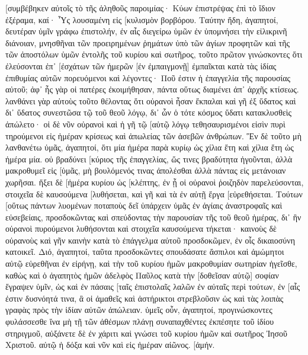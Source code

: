 [συμβέβηκεν αὐτοῖς τὸ τῆς ἀληθοῦς παροιμίας· Κύων ἐπιστρέψας ἐπὶ τὸ ἴδιον ἐξέραμα, καί· Ὗς λουσαμένη εἰς [κυλισμὸν βορβόρου. 
Ταύτην ἤδη, ἀγαπητοί, δευτέραν ὑμῖν γράφω ἐπιστολήν, ἐν αἷς διεγείρω ὑμῶν ἐν ὑπομνήσει τὴν εἰλικρινῆ διάνοιαν, 
μνησθῆναι τῶν προειρημένων ῥημάτων ὑπὸ τῶν ἁγίων προφητῶν καὶ τῆς τῶν ἀποστόλων ὑμῶν ἐντολῆς τοῦ κυρίου καὶ σωτῆρος, 
τοῦτο πρῶτον γινώσκοντες ὅτι ἐλεύσονται ἐπ᾽ [ἐσχάτων τῶν ἡμερῶν [ἐν ἐμπαιγμονῇ] ἐμπαῖκται κατὰ τὰς ἰδίας ἐπιθυμίας αὐτῶν πορευόμενοι 
καὶ λέγοντες· Ποῦ ἐστιν ἡ ἐπαγγελία τῆς παρουσίας αὐτοῦ; ἀφ᾽ ἧς γὰρ οἱ πατέρες ἐκοιμήθησαν, πάντα οὕτως διαμένει ἀπ᾽ ἀρχῆς κτίσεως. 
λανθάνει γὰρ αὐτοὺς τοῦτο θέλοντας ὅτι οὐρανοὶ ἦσαν ἔκπαλαι καὶ γῆ ἐξ ὕδατος καὶ δι᾽ ὕδατος συνεστῶσα τῷ τοῦ θεοῦ λόγῳ, 
δι᾽ ὧν ὁ τότε κόσμος ὕδατι κατακλυσθεὶς ἀπώλετο· 
οἱ δὲ νῦν οὐρανοὶ καὶ ἡ γῆ τῷ [αὐτῷ λόγῳ τεθησαυρισμένοι εἰσὶν πυρὶ τηρούμενοι εἰς ἡμέραν κρίσεως καὶ ἀπωλείας τῶν ἀσεβῶν ἀνθρώπων. 
Ἓν δὲ τοῦτο μὴ λανθανέτω ὑμᾶς, ἀγαπητοί, ὅτι μία ἡμέρα παρὰ κυρίῳ ὡς χίλια ἔτη καὶ χίλια ἔτη ὡς ἡμέρα μία. 
οὐ βραδύνει [κύριος τῆς ἐπαγγελίας, ὥς τινες βραδύτητα ἡγοῦνται, ἀλλὰ μακροθυμεῖ εἰς [ὑμᾶς, μὴ βουλόμενός τινας ἀπολέσθαι ἀλλὰ πάντας εἰς μετάνοιαν χωρῆσαι. 
ἥξει δὲ [ἡμέρα κυρίου ὡς [κλέπτης, ἐν ᾗ οἱ οὐρανοὶ ῥοιζηδὸν παρελεύσονται, στοιχεῖα δὲ καυσούμενα [λυθήσεται, καὶ γῆ καὶ τὰ ἐν αὐτῇ ἔργα [εὑρεθήσεται. 
Τούτων [οὕτως πάντων λυομένων ποταποὺς δεῖ ὑπάρχειν ὑμᾶς ἐν ἁγίαις ἀναστροφαῖς καὶ εὐσεβείαις, 
προσδοκῶντας καὶ σπεύδοντας τὴν παρουσίαν τῆς τοῦ θεοῦ ἡμέρας, δι᾽ ἣν οὐρανοὶ πυρούμενοι λυθήσονται καὶ στοιχεῖα καυσούμενα τήκεται· 
καινοὺς δὲ οὐρανοὺς καὶ γῆν καινὴν κατὰ τὸ ἐπάγγελμα αὐτοῦ προσδοκῶμεν, ἐν οἷς δικαιοσύνη κατοικεῖ. 
Διό, ἀγαπητοί, ταῦτα προσδοκῶντες σπουδάσατε ἄσπιλοι καὶ ἀμώμητοι αὐτῷ εὑρεθῆναι ἐν εἰρήνῃ, 
καὶ τὴν τοῦ κυρίου ἡμῶν μακροθυμίαν σωτηρίαν ἡγεῖσθε, καθὼς καὶ ὁ ἀγαπητὸς ἡμῶν ἀδελφὸς Παῦλος κατὰ τὴν [δοθεῖσαν αὐτῷ] σοφίαν ἔγραψεν ὑμῖν, 
ὡς καὶ ἐν πάσαις [ταῖς ἐπιστολαῖς λαλῶν ἐν αὐταῖς περὶ τούτων, ἐν [αἷς ἐστιν δυσνόητά τινα, ἃ οἱ ἀμαθεῖς καὶ ἀστήρικτοι στρεβλοῦσιν ὡς καὶ τὰς λοιπὰς γραφὰς πρὸς τὴν ἰδίαν αὐτῶν ἀπώλειαν. 
ὑμεῖς οὖν, ἀγαπητοί, προγινώσκοντες φυλάσσεσθε ἵνα μὴ τῇ τῶν ἀθέσμων πλάνῃ συναπαχθέντες ἐκπέσητε τοῦ ἰδίου στηριγμοῦ, 
αὐξάνετε δὲ ἐν χάριτι καὶ γνώσει τοῦ κυρίου ἡμῶν καὶ σωτῆρος Ἰησοῦ Χριστοῦ. αὐτῷ ἡ δόξα καὶ νῦν καὶ εἰς ἡμέραν αἰῶνος. [ἀμήν. 
